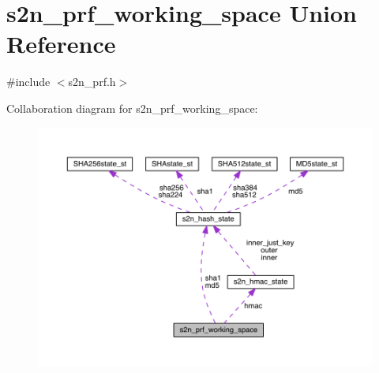 \hypertarget{unions2n__prf__working__space}{}\section{s2n\+\_\+prf\+\_\+working\+\_\+space Union Reference}
\label{unions2n__prf__working__space}


{\ttfamily \#include $<$s2n\+\_\+prf.\+h$>$}



Collaboration diagram for s2n\+\_\+prf\+\_\+working\+\_\+space\+:\nopagebreak
\begin{figure}[H]
\begin{center}
\leavevmode
\includegraphics[width=350pt]{unions2n__prf__working__space__coll__graph}
\end{center}
\end{figure}
